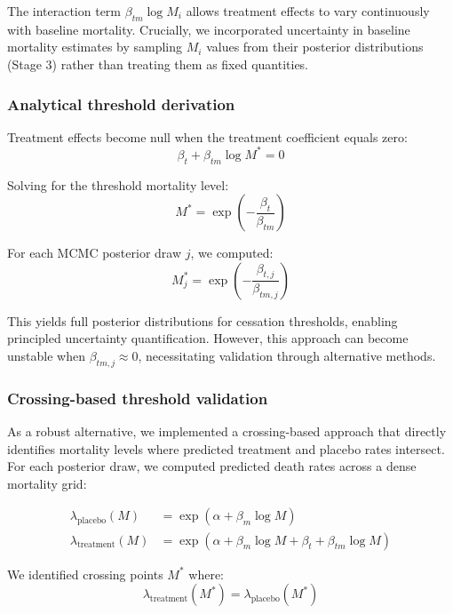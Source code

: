 \documentclass[11pt]{article}\usepackage[]{graphicx}\usepackage[]{xcolor}
\begin{document}
The interaction term $\beta_{tm} \log M_i$ allows treatment effects to vary continuously with baseline mortality. Crucially, we incorporated uncertainty in baseline mortality estimates by sampling $M_i$ values from their posterior distributions (Stage 3) rather than treating them as fixed quantities.

\subsubsection{Analytical threshold derivation}

Treatment effects become null when the treatment coefficient equals zero:
\begin{equation}
\beta_t + \beta_{tm} \log M^* = 0
\end{equation}

Solving for the threshold mortality level:
\begin{equation}
M^* = \exp\left(-\frac{\beta_t}{\beta_{tm}}\right)
\end{equation}

For each MCMC posterior draw $j$, we computed:
\begin{equation}
M^*_j = \exp\left(-\frac{\beta_{t,j}}{\beta_{tm,j}}\right)
\end{equation}

This yields full posterior distributions for cessation thresholds, enabling principled uncertainty quantification. However, this approach can become unstable when $\beta_{tm,j} \approx 0$, necessitating validation through alternative methods.

\subsubsection{Crossing-based threshold validation}

As a robust alternative, we implemented a crossing-based approach that directly identifies mortality levels where predicted treatment and placebo rates intersect. For each posterior draw, we computed predicted death rates across a dense mortality grid:

\begin{align}
\lambda_{\text{placebo}}(M) &= \exp(\alpha + \beta_m \log M) \\
\lambda_{\text{treatment}}(M) &= \exp(\alpha + \beta_m \log M + \beta_t + \beta_{tm} \log M)
\end{align}

We identified crossing points $M^*$ where:
\begin{equation}
\lambda_{\text{treatment}}(M^*) = \lambda_{\text{placebo}}(M^*)
\end{equation}
\end{document}
